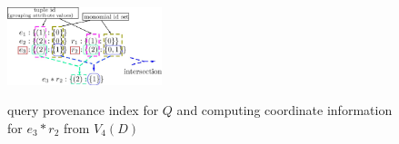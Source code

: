\begin{example}
\begin{figure}[t!]
    \centering
    \includegraphics[width=0.4\textwidth,height=0.2\textwidth]{Figures/intersection.jpg}
    \caption{query provenance index for $Q$ and computing coordinate information for $e_3*r_2$ from $V_4(D)$}
    \small \label{fig:query prov index}
\end{figure}





\end{example}
